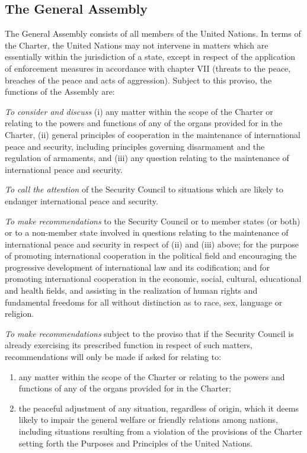 \documentclass[
  openany]{book}
\providecommand{\tightlist}{%
  \setlength{\itemsep}{0pt}\setlength{\parskip}{0pt}}
\begin{document}
\hypertarget{the-general-assembly}{%
\subsection{The General Assembly}\label{the-general-assembly}}

The General Assembly consists of all members of the United Nations. In terms of the Charter, the United Nations may not intervene in matters which are essentially within the jurisdiction of a state, except in respect of the application of enforcement measures in accordance with chapter VII (threats to the peace, breaches of the peace and acts of aggression). Subject to this proviso, the functions of the Assembly are:

\emph{To consider and discuss} (i) any matter within the scope of the Charter or relating to the powers and functions of any of the organs provided for in the Charter, (ii) general principles of cooperation in the maintenance of international peace and security, including principles governing disarmament and the regulation of armaments, and (iii) any question relating to the maintenance of international peace and security.

\emph{To call the attention} of the Security Council to situations which are likely to endanger international peace and security.

\emph{To make recommendations} to the Security Council or to member states (or both) or to a non-member state involved in questions relating to the maintenance of international peace and security in respect of (ii) and (iii) above; for the purpose of promoting international cooperation in the political field and encouraging the progressive development of international law and its codification; and for promoting international cooperation in the economic, social, cultural, educational and health fields, and assisting in the realization of human rights and fundamental freedoms for all without distinction as to race, sex, language or religion.

\emph{To make recommendations} subject to the proviso that if the Security Council is already exercising its prescribed function in respect of such matters, recommendations will only be made if asked for relating to:

\begin{enumerate}
\def\labelenumi{\arabic{enumi}.}
\tightlist
\item
  any matter within the scope of the Charter or relating to the powers and functions of any of the organs provided for in the Charter;
\item
  the peaceful adjustment of any situation, regardless of origin, which it deems likely to impair the general welfare or friendly relations among nations, including situations resulting from a violation of the provisions of the Charter setting forth the Purposes and Principles of the United Nations.
\end{enumerate}
\end{document}
